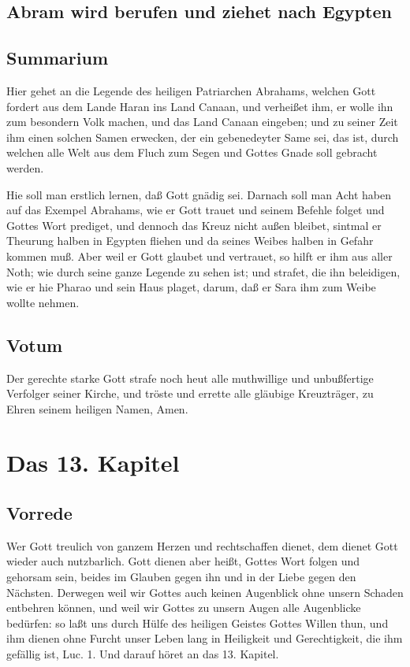 \section{Abram wird berufen und ziehet nach Egypten}

\section{Summarium}

Hier gehet an die Legende des heiligen Patriarchen Abrahams, welchen Gott fordert aus dem Lande Haran ins Land Canaan, und verheißet ihm, er wolle ihn zum besondern Volk machen, und das Land Canaan eingeben; und zu seiner Zeit ihm einen solchen Samen erwecken, der ein gebenedeyter Same sei, das ist, durch welchen alle Welt aus dem Fluch zum Segen und Gottes Gnade soll gebracht werden.

Hie soll man erstlich lernen, daß Gott gnädig sei. Darnach soll man Acht haben auf das Exempel Abrahams, wie er Gott trauet und seinem Befehle folget und Gottes Wort prediget, und dennoch das Kreuz nicht außen bleibet, sintmal er Theurung halben in Egypten fliehen und da seines Weibes halben in Gefahr kommen muß. Aber weil er Gott glaubet und vertrauet, so hilft er ihm aus aller Noth; wie durch seine ganze Legende zu sehen ist; und strafet, die ihn beleidigen, wie er hie Pharao und sein Haus plaget, darum, daß er Sara ihm zum Weibe wollte nehmen.

\section{Votum}

Der gerechte starke Gott strafe noch heut alle muthwillige und unbußfertige Verfolger seiner Kirche, und tröste und errette alle gläubige Kreuzträger, zu Ehren seinem heiligen Namen, Amen.

\chapter{Das 13. Kapitel}

\section{Vorrede}

Wer Gott treulich von ganzem Herzen und rechtschaffen dienet, dem dienet Gott wieder auch nutzbarlich. Gott dienen aber heißt, Gottes Wort folgen und gehorsam sein, beides im Glauben gegen ihn und in der Liebe gegen den Nächsten. Derwegen weil wir Gottes auch keinen Augenblick ohne unsern Schaden entbehren können, und weil wir Gottes zu unsern Augen alle Augenblicke bedürfen: so laßt uns durch Hülfe des heiligen Geistes Gottes Willen thun, und ihm dienen ohne Furcht unser Leben lang in Heiligkeit und Gerechtigkeit, die ihm gefällig ist, Luc. 1. Und darauf höret an das 13. Kapitel.

